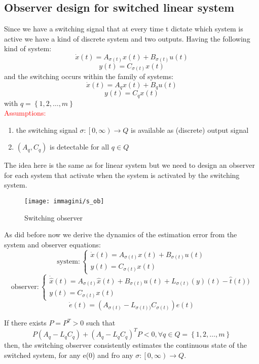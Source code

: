 \subsection{Observer design for switched linear system}
Since we have a switching signal that at every time t dictate which system is active we have a kind of discrete system and two outputs.
\newline
Having the following kind of system:
\[
\dot{x}(t)=A_{\sigma(t)}x(t)+B_{\sigma(t)}u(t)\]
\[
y(t)=C_{\sigma(t)}x(t)
\]
and the switching occurs within the family of systems:
\[
\dot{x}(t)=A_qx(t)+B_qu(t) \]
\[
y(t)=C_qx(t)
\] with $ q=\left\{1,2,\dots,m\right\}$\\
\textcolor{red}{Assumptions:}
\begin{enumerate}
\item[(i)] the switching signal $\sigma\colon \left[0,\infty\right)\to Q$ is available as (discrete) output signal
\item[(ii)] $(A_q,C_q)$ is detectable for all $q\in Q$
\end{enumerate}
The idea here is the same as for linear system but we need to design an observer for each system that activate when the system is activated by the switching system.
\begin{figure}[H]
	\centering
	\texttt{[image: immagini/s\_ob]}
	\caption{Switching observer}
	\label{s_on}
\end{figure}
As did before now we derive the dynamics of the estimation error from the system and observer equations:
\[\text{system}\colon \begin{cases}
	\dot{x}(t)=A_{\sigma(t)}x(t)+B_{\sigma(t)}u(t)\\
	y(t)=C_{\sigma(t)}x(t)
\end{cases}
\]
\[\text{observer}\colon \begin{cases}
	\dot{\hat{x}}(t)=A_{\sigma(t)}\hat{x}(t)+B_{\sigma(t)}u(t)+L_{\sigma(t)}(y)(t)-\hat{t}(t))\\
	y(t)=C_{\sigma(t)}x(t)
\end{cases}
\]
\[
\boxed{\dot{e}(t)=\left( A_{\sigma(t)}-L_{\sigma(t))}C_{\sigma(t)}\right)e(t)}
\]
\begin{thm}
	If there exists $P=P^T>0$ such that \[P(A_q-L_qC_q)+(A_q-L_qC_q)^TP<0, \forall q \in Q=\left\{1,2,\dots,m\right\}\] then, the switching observer consistently estimates the continuous state of the switched system, for any e(0) and fro any $\sigma \colon \left[0,\infty\right) \to Q$.
\end{thm}


